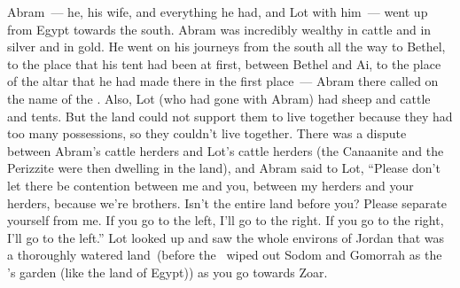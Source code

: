 
\begin{inparaenum}
   Abram~--- he, his wife, and everything he had, and Lot with him~--- went up from Egypt towards the south.%
   Abram was incredibly wealthy in cattle and in silver and in gold.%
   He went on his journeys from the south all the way to Bethel, to the place that his tent had been at first, between Bethel and Ai,%
   to the place of the altar that he had made there in the first place~--- Abram there called on the name of the \lord.%
   Also, Lot (who had gone with Abram) had sheep and cattle and tents.%
   But the land could not support them to live together because they had too many possessions, so they couldn't live together.%
   There was a dispute between Abram's cattle herders and Lot's cattle herders (the Canaanite and the Perizzite were then dwelling in the land),%
   and Abram said to Lot, ``Please don't let there be contention between me and you, between my herders and your herders, because we're brothers.%
   Isn't the entire land before you? Please separate yourself from me. If you go to the left, I'll go to the right. If you go to the right, I'll go to the left.''%
   Lot looked up and saw the whole environs of Jordan that was a thoroughly watered land\understood{}\ (before the \lord\ wiped out Sodom and Gomorrah as the \lord's garden (like the land of Egypt)) as you go towards Zoar.%

\end{inparaenum}
